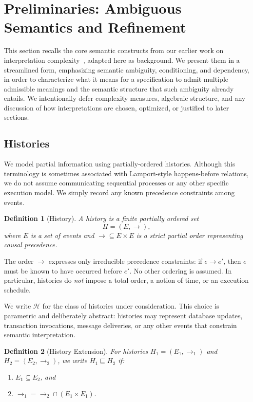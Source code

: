 \documentclass[acmsmall,nonacm]{acmart}
\newtheorem{definition}{Definition}
\theoremstyle{remark}
\numberwithin{definition}{section}
\numberwithin{theorem}{section}
\numberwithin{lemma}{section}
\numberwithin{corollary}{section}
\numberwithin{remark}{section}
\numberwithin{example}{section}
\numberwithin{observation}{section}
\numberwithin{assumption}{section}
\newcommand{\Hist}{\mathcal{H}}
\begin{document}
\section{Preliminaries: Ambiguous Semantics and Refinement}
\label{sec:prelim}

This section recalls the core semantic constructs from our earlier work on
interpretation complexity~\cite{hellerstein2026interpretation}, adapted here as
background.
We present them in a streamlined form, emphasizing semantic ambiguity,
conditioning, and dependency, in order to characterize what it means for a
specification to admit multiple admissible meanings and the semantic structure
that such ambiguity already entails.
We intentionally defer complexity measures, algebraic structure, and any
discussion of how interpretations are chosen, optimized, or justified to later
sections.

\subsection{Histories}

We model partial information using partially-ordered histories.
Although this terminology is sometimes associated with Lamport-style
happens-before relations, we do not assume communicating sequential processes
or any other specific execution model.
We simply record any known precedence constraints among events.

\begin{definition}[History]
A \emph{history} is a finite partially ordered set
\[
  H = (E, \rightarrow),
\]
where $E$ is a set of events and $\rightarrow \subseteq E \times E$ is a strict
partial order representing causal precedence.
\end{definition}

The order $\rightarrow$ expresses only irreducible precedence constraints: if
$e \rightarrow e'$, then $e$ must be known to have occurred before $e'$.
No other ordering is assumed.
In particular, histories do \emph{not} impose a total order, a notion of time, or
an execution schedule.

We write $\Hist$ for the class of histories under consideration.
This choice is parametric and deliberately abstract: histories may represent
database updates, transaction invocations, message deliveries, or any other
events that constrain semantic interpretation.

\begin{definition}[History Extension]
For histories $H_1=(E_1,\rightarrow_1)$ and $H_2=(E_2,\rightarrow_2)$, we write
$H_1 \sqsubseteq H_2$ if:
\begin{enumerate}
  \item $E_1 \subseteq E_2$, and
  \item $\rightarrow_1 = \rightarrow_2 \cap (E_1 \times E_1)$.
\end{enumerate}
\end{definition}
\end{document}
